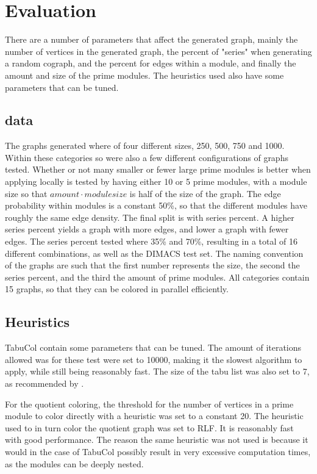 \documentclass[a4paper]{article}
\begin{document}
\section{Evaluation}
\label{sec:Evaluation}
There are a number of parameters that affect the generated graph, mainly the
number of vertices in the generated graph, the percent of "series" when generating
a random cograph, and the percent for edges within a module, and finally the
amount and size of the prime modules. The heuristics used also have some
parameters that can be tuned.

\subsection{data}

The graphs generated where of four different sizes, 250, 500, 750 and 1000. 
Within these categories so were also a few different configurations of graphs
tested. Whether or not many smaller or fewer large prime modules is better when
applying locally is tested by having either 10 or 5 prime modules, with a module
size so that $amount \cdot module size$ is half of the size of the graph. The
edge probability within modules is a  constant 50\%, so that the different
modules have roughly the same edge density. The final split is with series
percent. A higher series percent yields a graph with more edges, and lower a
graph with fewer  edges. The series percent tested where 35\% and 70\%,
resulting in a total of 16 different combinations, as well as the DIMACS test
set. The naming convention of the graphs are such that the first number
represents the size, the second the series percent, and the third the amount of
prime modules. All categories contain 15 graphs, so that they can be colored in
parallel efficiently.


\subsection{Heuristics}
TabuCol contain some parameters that can be tuned. The amount of
iterations allowed was for these test were set to 10000, making it the slowest
algorithm to apply, while still being reasonably fast. The size of the tabu list 
was also set to 7, as recommended by \cite{1990}.

For the quotient coloring, the threshold for the number of vertices in a prime
module to color directly with a heuristic was set to a constant 20. The
heuristic used to in turn color the quotient graph was set to RLF. It is
reasonably fast with good performance. The reason the same heuristic was not
used is because it would in the case of TabuCol possibly result in very
excessive computation times, as the modules can be deeply nested.
\end{document}
